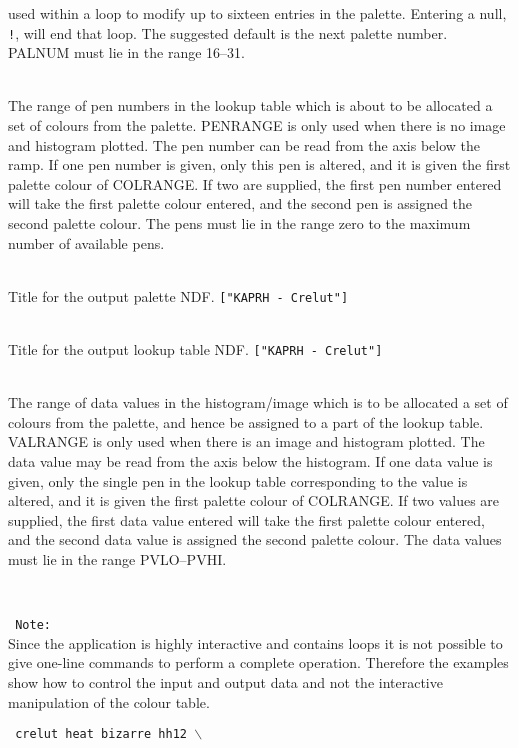 \documentclass[twoside,11pt]{article}
\newcommand{\htmlref}[2]{#1}
\newcommand{\sstexamples}[1]{
   \goodbreak
   \item[Examples:] \mbox{} \\
   \vspace{-3.5ex}
   \begin{description}
      #1
   \end{description}
}
\newcommand{\sstsubsection}[1]{ \item[{#1}] \mbox{} \\}
\newcommand{\sstexamplesubsection}[2]{\sloppy \item{\ssttt #1} \mbox{} \\ #2 }
\newcommand{\ssttt}{\tt}
\newcommand{\sstexamples}[1]{%
      \item[\htmlref{Examples:}{ap:example}]%
      \begin{description}
         #1
      \end{description}
   }
\newcommand{\sstsubsection}[1]{\item[{#1}]}
\newcommand{\sstexamplesubsection}[2]{%
      \item[{\ssttt #1}]
      #2\smallskip%
   }
\begin{document}
{{{         used within a loop to modify up to sixteen entries in the
         palette.  Entering a null, {\tt !}, will end that loop.  The
         suggested default is the next palette number.  PALNUM must lie
         in the range 16--31.
      }
      \sstsubsection{
         PENRANGE() = \_INTEGER (Read)
      }{
         The range of pen numbers in the lookup table which is about to
         be allocated a set of colours from the palette.  PENRANGE is
         only used when there is no image and histogram plotted.  The
         pen number can be read from the axis below the ramp.  If one
         pen number is given, only this pen is altered, and it is given
         the first palette colour of COLRANGE.  If two are supplied,
         the first pen number entered will take the first palette
         colour entered, and the second pen is assigned the second
         palette colour.  The pens must lie in the range zero to the
         maximum number of available pens.
      }
      \sstsubsection{
         PTITLE = LITERAL (Read)
      }{
         Title for the output palette NDF. {\tt ["KAPRH - Crelut"]}
      }
      \sstsubsection{
         TITLE = LITERAL (Read)
      }{
         Title for the output lookup table NDF. {\tt ["KAPRH - Crelut"]}
      }
      \sstsubsection{
         VALRANGE() = \_DOUBLE (Read)
      }{
         The range of data values in the histogram/image which is to
         be allocated a set of colours from the palette, and hence be
         assigned to a part of the lookup table.  VALRANGE is only used
         when there is an image and histogram plotted.  The data value
         may be read from the axis below the histogram.  If one data
         value is given, only the single pen in the lookup table
         corresponding to the value is altered, and it is given the
         first palette colour of COLRANGE.  If two values are supplied,
         the first data value entered will take the first palette
         colour entered, and the second data value is assigned the
         second palette colour.  The data values must lie in the range
         PVLO--PVHI.
      }
   }
   \sstexamples{
      \sstexamplesubsection{
         Note:
      }{
         Since the application is highly interactive and contains loops
         it is not possible to give one-line commands to perform a
         complete operation.  Therefore the examples show how to
         control the input and output data and not the interactive
         manipulation of the colour table.
      }
      \sstexamplesubsection{
         crelut heat bizarre hh12 $\backslash$
}}}
\end{document}
